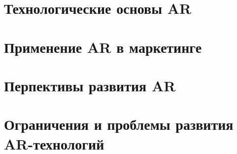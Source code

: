\documentclass[referat]{SCWorks}
\begin{document}


\date{2025}

\maketitle

\secNumbering

\tableofcontents




\intro



\section{Технологические основы AR}


\section{Применение AR в маркетинге}


\section{Перпективы развития AR}


\section{Ограничения и проблемы развития AR-технологий}

\end{document}
